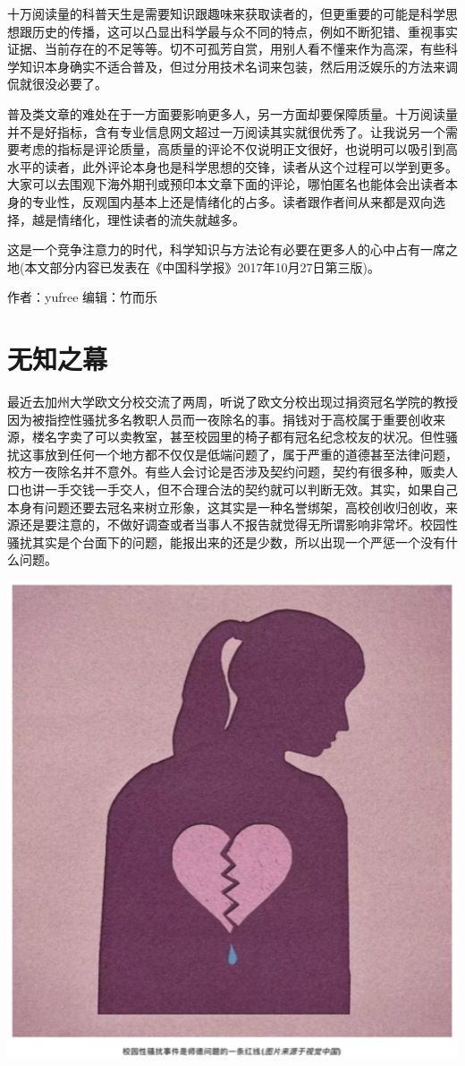 \documentclass[]{book}
\begin{document}
十万阅读量的科普天生是需要知识跟趣味来获取读者的，但更重要的可能是科学思想跟历史的传播，这可以凸显出科学最与众不同的特点，例如不断犯错、重视事实证据、当前存在的不足等等。切不可孤芳自赏，用别人看不懂来作为高深，有些科学知识本身确实不适合普及，但过分用技术名词来包装，然后用泛娱乐的方法来调侃就很没必要了。

普及类文章的难处在于一方面要影响更多人，另一方面却要保障质量。十万阅读量并不是好指标，含有专业信息网文超过一万阅读其实就很优秀了。让我说另一个需要考虑的指标是评论质量，高质量的评论不仅说明正文很好，也说明可以吸引到高水平的读者，此外评论本身也是科学思想的交锋，读者从这个过程可以学到更多。大家可以去围观下海外期刊或预印本文章下面的评论，哪怕匿名也能体会出读者本身的专业性，反观国内基本上还是情绪化的占多。读者跟作者间从来都是双向选择，越是情绪化，理性读者的流失就越多。

这是一个竞争注意力的时代，科学知识与方法论有必要在更多人的心中占有一席之地(本文部分内容已发表在《中国科学报》2017年10月27日第三版)。

作者：yufree 编辑：竹而乐

\section{无知之幕}

最近去加州大学欧文分校交流了两周，听说了欧文分校出现过捐资冠名学院的教授因为被指控性骚扰多名教职人员而一夜除名的事。捐钱对于高校属于重要创收来源，楼名字卖了可以卖教室，甚至校园里的椅子都有冠名纪念校友的状况。但性骚扰这事放到任何一个地方都不仅仅是低端问题了，属于严重的道德甚至法律问题，校方一夜除名并不意外。有些人会讨论是否涉及契约问题，契约有很多种，贩卖人口也讲一手交钱一手交人，但不合理合法的契约就可以判断无效。其实，如果自己本身有问题还要去冠名来树立形象，这其实是一种名誉绑架，高校创收归创收，来源还是要注意的，不做好调查或者当事人不报告就觉得无所谓影响非常坏。校园性骚扰其实是个台面下的问题，能报出来的还是少数，所以出现一个严惩一个没有什么问题。

\includegraphics[width=6.24in]{images/wuzhi1}
\end{document}
